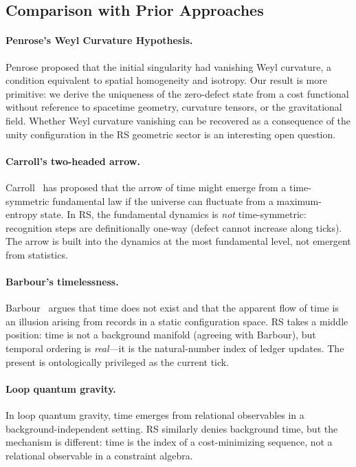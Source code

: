 \documentclass[12pt,a4paper]{article}
\theoremstyle{definition}
\theoremstyle{remark}
\begin{document}
\subsection{Comparison with Prior Approaches}

\paragraph{Penrose's Weyl Curvature Hypothesis.}
Penrose proposed that the initial singularity had vanishing Weyl curvature,
a condition equivalent to spatial homogeneity and isotropy.  Our result is
more primitive: we derive the uniqueness of the zero-defect state from a
cost functional without reference to spacetime geometry, curvature tensors,
or the gravitational field.  Whether Weyl curvature vanishing can be
recovered as a consequence of the unity configuration in the RS geometric
sector is an interesting open question.

\paragraph{Carroll's two-headed arrow.}
Carroll~\cite{Carroll2010} has proposed that the arrow of time might emerge
from a time-symmetric fundamental law if the universe can fluctuate from
a maximum-entropy state.  In RS, the fundamental dynamics is \emph{not}
time-symmetric: recognition steps are definitionally one-way (defect cannot
increase along ticks).  The arrow is built into the dynamics at the most
fundamental level, not emergent from statistics.

\paragraph{Barbour's timelessness.}
Barbour~\cite{Barbour1999} argues that time does not exist and that the
apparent flow of time is an illusion arising from records in a static
configuration space.  RS takes a middle position: time is not a background
manifold (agreeing with Barbour), but temporal ordering is
\emph{real}---it is the natural-number index of ledger updates.  The
present is ontologically privileged as the current tick.

\paragraph{Loop quantum gravity.}
In loop quantum gravity, time emerges from relational observables in a
background-independent setting.  RS similarly denies background time, but
the mechanism is different: time is the index of a cost-minimizing sequence,
not a relational observable in a constraint algebra.
\end{document}
